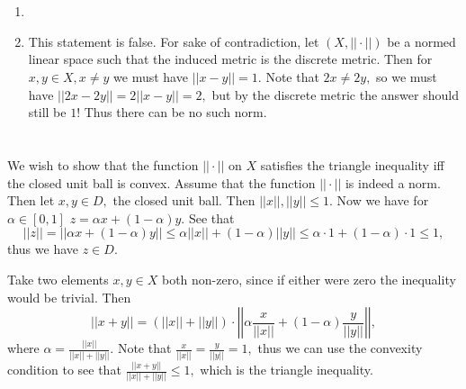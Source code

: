 \documentclass{article}
\title{} %
\author{Gandhar Kulkarni (mmat2304)} %
\date{} %
\begin{document}
\maketitle %


\section{} %
\begin{enumerate}
	\item
	\item This statement is false. For sake of contradiction, let $(X,||\cdot||)$ be a normed linear space such that the induced metric is the discrete 
	metric. Then for $x,y \in X, x \neq y$ we must have $||x-y|| =1.$ Note that $2x\neq 2y,$ so we must have $||2x-2y||=2||x-y||=2,$ but by the discrete 
	metric the answer should still be $1!$ Thus there can be no such norm.
\end{enumerate}
\section{} %
We wish to show that the function $||\cdot|| $ on $X$ satisfies the triangle inequality iff the closed unit ball is convex.
Assume that the function $||\cdot||$ is indeed a norm. Then let $x,y \in D,$ the closed unit ball. Then $||x||,||y|| \leq 1.$ Now we have for $\alpha \in 
[0,1]$ $z=\alpha x+(1-\alpha)y.$ See that $$||z|| =||\alpha x+(1-\alpha)y|| \leq \alpha ||x|| + (1-\alpha) ||y|| \leq \alpha \cdot 1 + (1-\alpha) \cdot 1 
\leq 1,$$ thus we have $z \in D.$

Take two elements $x,y \in X$ both non-zero, since if either were zero the inequality would be trivial. Then $$||x+y|| = (||x||+||y||)\cdot 
\left|\left|\alpha \frac{x}{||x||}+ (1-\alpha)\frac{y}{||y||}\right|\right|,$$ where $\alpha=\frac{||x||}{||x||+||y||}.$ Note that 
$\frac{x}{||x||}=\frac{y}{||y||}=1,$ thus we can use the convexity condition to see that $\frac{||x+y||}{||x||+||y||} \leq 1,$ which is the triangle 
inequality.
\end{document}
